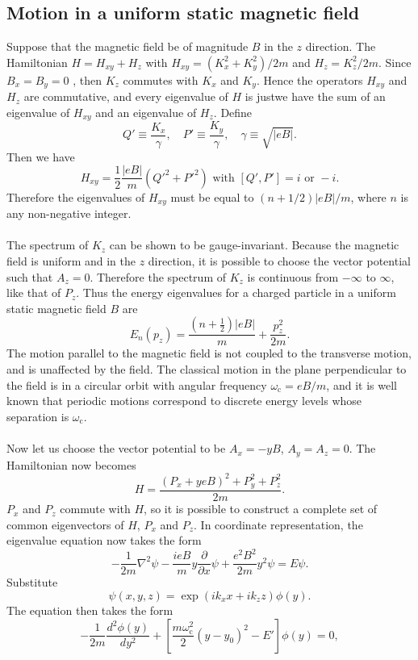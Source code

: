 \subsection{Motion in a uniform static magnetic field} 
Suppose that the magnetic field be of magnitude $B$ in the $z$ direction. The Hamiltonian $H = H_{xy}+H_z$ with $H_{xy} = (K_x^2+K_y^2)/{2m}$ and $H_z = {K_z^2}/{2m}$. 
Since $B_x = B_y = 0$ , then $K_z$ commutes with $K_x$ and $K_y$. Hence the operators $H_{xy}$ and $H_z$ are commutative, and every eigenvalue of $H$ is justwe have
the sum of an eigenvalue of $H_{xy}$ and an eigenvalue of $H_z$.
Define
\[Q' \equiv \frac{K_x}{\gamma} , \quad P' \equiv \frac{K_y}{\gamma} , \quad \gamma \equiv \sqrt{|eB|} .\]
Then we have
\[H_{xy} = \frac{1}{2} \frac{|eB|}{m}(Q'^2+P'^2) \mbox{  with  } [Q',P'] = i \mbox{  or  }-i.\]
Therefore the eigenvalues of $H_{xy}$ must be equal to $(n+1/2)|eB|/m$, where $n$ is any non-negative integer.
\\ \\
The spectrum of $K_z$ can be shown to be gauge-invariant.
Because the magnetic field is uniform and in the $z$ direction, it is possible to choose the vector potential such that $A_z = 0$. Therefore the spectrum of $K_z$ is
continuous from $-\infty$ to $\infty$, like that of $P_z$.
Thus the energy eigenvalues for a charged particle in a uniform static magnetic field $B$ are
\[E_n(p_z) = \frac{(n+\frac{1}{2})|eB|}{m} + \frac{p_z^2}{2m}.\]
The motion parallel to the magnetic field is not coupled to the transverse motion, and is unaffected by the field. The classical motion in the plane perpendicular to the field is
in a circular orbit with angular frequency $\omega_{\mathrm{c}} = {eB}/{m}$, and it is well known that periodic motions correspond to discrete energy levels whose separation is $\omega_{\mathrm{c}}$.
\\ \\
Now let us choose the vector potential to be $A_x=-yB$, $A_y=A_z=0$. The Hamiltonian now becomes
\[H = \frac{(P_x+yeB)^2 + P_y^2 + P_z^2}{2m}.\]
$P_x$ and $P_z$ commute with $H$, so it is possible to construct a complete set of common eigenvectors of $H$, $P_x$ and $P_z$. In coordinate representation, the eigenvalue equation now takes the form
\[-\frac{1}{2m}\nabla^2 \psi - \frac{ieB}{m}y\frac{\partial}{\partial x}\psi + \frac{e^2B^2}{2m}y^2\psi = E\psi.\]
Substitute
\[\psi(x,y,z) = \exp(ik_xx+ik_zz)\phi(y).\]
The equation then takes the form
\[-\frac{1}{2m} \frac{d^2\phi(y)}{dy^2} + \left[ \frac{m\omega_{\mathrm{c}}^2}{2}(y-y_0)^2-E' \right]\phi(y) = 0,\]

